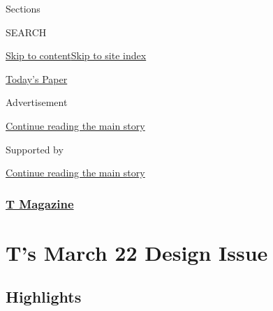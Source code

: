 Sections

SEARCH

\protect\hyperlink{site-content}{Skip to
content}\protect\hyperlink{site-index}{Skip to site index}

\href{https://myaccount.nytimes.com/auth/login?response_type=cookie\&client_id=vi}{}

\href{https://www.nytimes.com/section/todayspaper}{Today's Paper}

Advertisement

\protect\hyperlink{after-top}{Continue reading the main story}

Supported by

\protect\hyperlink{after-sponsor}{Continue reading the main story}

\hypertarget{t-magazine}{%
\subsubsection{\texorpdfstring{\href{/section/t-magazine}{T
Magazine}}{T Magazine}}\label{t-magazine}}

\hypertarget{ts-march-22-design-issue}{%
\section{T's March 22 Design Issue}\label{ts-march-22-design-issue}}

\hypertarget{highlights}{%
\subsection{Highlights}\label{highlights}}

